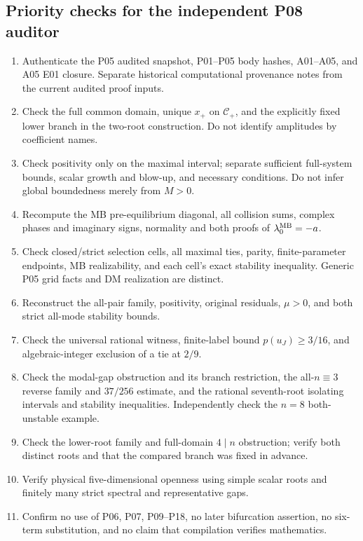 \subsection{Priority checks for the independent P08 auditor}
\begin{enumerate}[label=(\arabic*),leftmargin=*]
\item Authenticate the P05 audited snapshot, P01--P05 body hashes,
A01--A05, and A05 E01 closure. Separate historical computational
provenance notes from the current audited proof inputs.
\item Check the full common domain, unique $x_+$ on $\mathcal C_+$,
and the explicitly fixed lower branch in the two-root construction.
Do not identify amplitudes by coefficient names.
\item Check positivity only on the maximal interval; separate sufficient
full-system bounds, scalar growth and blow-up, and necessary conditions.
Do not infer global boundedness merely from $M>0$.
\item Recompute the MB pre-equilibrium diagonal, all collision sums,
complex phases and imaginary signs, normality and both proofs of
$\lambda_0^{\mathrm{MB}}=-a$.
\item Check closed/strict selection cells, all maximal ties, parity,
finite-parameter endpoints, MB realizability, and each cell's exact
stability inequality. Generic P05 grid facts and DM realization are distinct.
\item Reconstruct the all-pair family, positivity, original residuals,
$\mu>0$, and both strict all-mode stability bounds.
\item Check the universal rational witness, finite-label bound
$p(u_J)\ge3/16$, and algebraic-integer exclusion of a tie at $2/9$.
\item Check the modal-gap obstruction and its branch restriction,
the all-$n\equiv3$ reverse family and $37/256$ estimate, and the
rational seventh-root isolating intervals and stability inequalities.
Independently check the $n=8$ both-unstable example.
\item Check the lower-root family and full-domain $4\mid n$ obstruction;
verify both distinct roots and that the compared branch was fixed in advance.
\item Verify physical five-dimensional openness using simple scalar
roots and finitely many strict spectral and representative gaps.
\item Confirm no use of P06, P07, P09--P18, no later bifurcation assertion,
no six-term substitution, and no claim that compilation verifies mathematics.
\end{enumerate}
